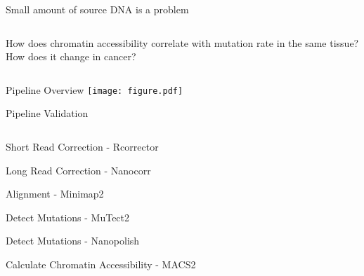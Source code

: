 \documentclass{beamer}
\begin{document}
\begin{frame}{Small amount of source DNA is a problem}
\begin{columns}
\end{columns}
\end{frame}


\begin{frame}{How does chromatin accessibility correlate with mutation rate in the same tissue? How does it change in cancer?}
\begin{columns}
\end{columns}
\end{frame}


\begin{frame}{Pipeline Overview}
\texttt{[image: figure.pdf]}
\end{frame}

\begin{frame}{Pipeline Validation}
\begin{columns}
\end{columns}
\end{frame}

\begin{frame}{Short Read Correction - Rcorrector}
\end{frame}

\begin{frame}{Long Read Correction - Nanocorr}
\end{frame}

\begin{frame}{Alignment - Minimap2}
\end{frame}

\begin{frame}{Detect Mutations - MuTect2}
\end{frame}

\begin{frame}{Detect Mutations - Nanopolish}
\end{frame}

\begin{frame}{Calculate Chromatin Accessibility - MACS2}
\end{frame}
\end{document}
